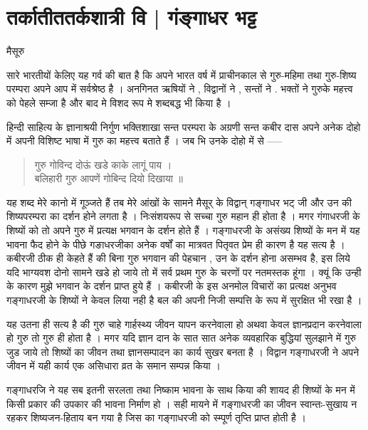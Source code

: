 \chapter{तर्कातीततर्कशात्री वि | गंङ्गाधर भट्ट}

\begin{center}
\smallskip
मैसूरु

\end{center}
सारे भारतीयों केलिए यह गर्व की बात है कि अपने भारत वर्ष में प्राचीनकाल से गुरु-महिमा तथा गुरु-शिष्य परम्परा अपने आप में सर्वश्रेष्ठ है । अनगिनत ऋषियों ने , विद्वानों ने , सन्तों ने . भक्तों ने गुरुके महत्त्व को पेहले सम्जा है और बाद मे विशद रूप मे शब्दबद्ध भी किया है । 

हिन्दी साहित्य के ज्ञानाश्रयी निर्गुण भक्तिशाखा सन्त परम्परा के अग्रणी सन्त कबीर दास अपने अनेक दोहो में अपनी विशिष्ट भाषा में गुरु का महत्त्व बताते हैं । जब भि उनके दोहो में से ----- 
\begin{verse}
गुरु गोविन्द दोऊं खडे काके लागूं पाय ।\\	
बलिहारी गुरु आपणें गोबिन्द दियो दिखाया ॥
\end{verse}
यह शब्द मेरे कानो में गूञ्जते हैं तब मेरे आंखों के सामने मैसूर् के विद्वान् गङ्गाधर भट् जी और उन की शिष्यपरम्परा का दर्शन होने लगता है । निःसंशयरूप से सच्चा गुरु महान ही होता है । मगर गंगाधरजी के शिष्यों को तो अपने गुरु में प्रत्यक्ष भगवान के दर्शन होते हैं । गङ्गाधरजी के असंख्य शिष्यों के मन में यह भावना फैद होने के पीछे गङाधरजीका अनेक वर्षों का मात्रवत पितृवत प्रेम ही कारण है यह सत्य है । कबीरजी ठीक ही केहते हैं की बिना गुरु भगवान की पेहचान , उन के दर्शन होना असम्भव है, इस लिये यदि भाग्यवश दोनो सामने खडे हो जाये तो में सर्व  प्रथम गुरु के चरणों पर नतमस्तक हूंगा । क्यूं कि उन्ही के कारण मुझे भगवान के दर्शन प्राप्त हुये हैं । कबीरजी के इस अनमोल विचारों का प्रत्यक्ष अनुभव गङ्गाधरजी के शिष्यों ने केवल लिया नही है बल की अपनी निजी सम्पत्ति के रूप में सुरक्षित भी रखा है । 

यह उतना ही सत्य है की गुरु चाहे गार्हस्थ्य जीवन यापन करनेवाला हो अथवा केवल ज्ञानप्रदान करनेवाला हो गुरु तो गुरु ही होता है । मगर यदि ज्ञान दान के सात सात अनेक व्यवहारिक बुद्धियां सुलझाने में गुरु जुड जाये तो शिष्यों का जीवन तथा ज्ञानसम्पादन का कार्य सुखर बनता है । विद्वान गङ्गाधरजी ने अपने जीवन में यही कार्य एक असिधारा व्रत के समान सम्पन्न किया । 

गङ्गाधरजि ने यह सब इतनी सरलता तथा निष्काम भावना के साथ किया की शायद ही शिष्यों के मन में किसी प्रकार की उपकार की भावना निर्माण हो । सही मायने में गङ्गाधरजी का जीवन स्वान्तः-सुखाय न रहकर शिष्यजन-हिताय बन गया है जिस का गङ्गाधरजी को स्म्पूर्ण तृप्ति प्राप्त होती है ।

